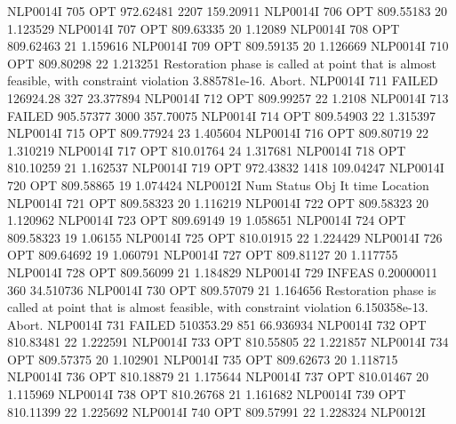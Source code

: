NLP0014I           705         OPT 972.62481     2207 159.20911
NLP0014I           706         OPT 809.55183       20 1.123529
NLP0014I           707         OPT 809.63335       20 1.12089
NLP0014I           708         OPT 809.62463       21 1.159616
NLP0014I           709         OPT 809.59135       20 1.126669
NLP0014I           710         OPT 809.80298       22 1.213251
Restoration phase is called at point that is almost feasible,
  with constraint violation 3.885781e-16. Abort.
NLP0014I           711      FAILED 126924.28      327 23.377894
NLP0014I           712         OPT 809.99257       22 1.2108
NLP0014I           713      FAILED 905.57377     3000 357.70075
NLP0014I           714         OPT 809.54903       22 1.315397
NLP0014I           715         OPT 809.77924       23 1.405604
NLP0014I           716         OPT 809.80719       22 1.310219
NLP0014I           717         OPT 810.01764       24 1.317681
NLP0014I           718         OPT 810.10259       21 1.162537
NLP0014I           719         OPT 972.43832     1418 109.04247
NLP0014I           720         OPT 809.58865       19 1.074424
NLP0012I 
              Num      Status      Obj             It       time                 Location
NLP0014I           721         OPT 809.58323       20 1.116219
NLP0014I           722         OPT 809.58323       20 1.120962
NLP0014I           723         OPT 809.69149       19 1.058651
NLP0014I           724         OPT 809.58323       19 1.06155
NLP0014I           725         OPT 810.01915       22 1.224429
NLP0014I           726         OPT 809.64692       19 1.060791
NLP0014I           727         OPT 809.81127       20 1.117755
NLP0014I           728         OPT 809.56099       21 1.184829
NLP0014I           729      INFEAS 0.20000011      360 34.510736
NLP0014I           730         OPT 809.57079       21 1.164656
Restoration phase is called at point that is almost feasible,
  with constraint violation 6.150358e-13. Abort.
NLP0014I           731      FAILED 510353.29      851 66.936934
NLP0014I           732         OPT 810.83481       22 1.222591
NLP0014I           733         OPT 810.55805       22 1.221857
NLP0014I           734         OPT 809.57375       20 1.102901
NLP0014I           735         OPT 809.62673       20 1.118715
NLP0014I           736         OPT 810.18879       21 1.175644
NLP0014I           737         OPT 810.01467       20 1.115969
NLP0014I           738         OPT 810.26768       21 1.161682
NLP0014I           739         OPT 810.11399       22 1.225692
NLP0014I           740         OPT 809.57991       22 1.228324
NLP0012I 
